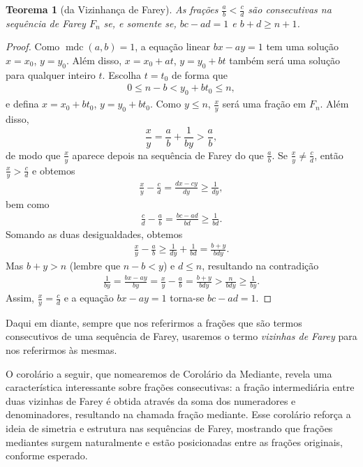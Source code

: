 \documentclass{hipatia}
\newtheorem*{theorem*}{Teorema}
\theoremstyle{definition} %
\begin{document}
\begin{theorem*} [da Vizinhança de Farey]
As frações \(\frac{a}{b} < \frac{c}{d}\) são consecutivas na sequência de Farey \(F_n\) se, e somente se, \(bc - ad = 1\) e $b+d\geq n+1$.
\end{theorem*}

\begin{proof}
Como \(\operatorname{mdc}(a, b) = 1\), a equação linear \(bx - ay = 1\) tem uma solução \(x = x_0\), \(y = y_0\). Além disso, \(x = x_0 + at\), \(y = y_0 + bt\) também será uma solução para qualquer inteiro \(t\). Escolha \(t = t_0\) de forma que
\begin{align*}
0 \leq n - b < y_0 + bt_0 \leq n,
\end{align*}
e defina \(x = x_0 + bt_0\), \(y = y_0 + bt_0\). Como \(y \leq n\), \(\frac{x}{y}\) será uma fração em \(F_n\). Além disso,
\[
\frac{x}{y} = \frac{a}{b} + \frac{1}{by} > \frac{a}{b},
\]
de modo que \(\frac{x}{y}\) aparece depois na sequência de Farey do que \(\frac{a}{b}\). Se \(\frac{x}{y} \neq \frac{c}{d}\), então \(\frac{x}{y} > \frac{c}{d}\) e obtemos
\begin{align*}
\frac{x}{y} - \frac{c}{d} = \frac{dx - cy}{dy} \geq \frac{1}{dy},
\end{align*}
bem como
\begin{align*}
\frac{c}{d} - \frac{a}{b} = \frac{bc - ad}{bd} \geq \frac{1}{bd}.
\end{align*}
Somando as duas desigualdades, obtemos
\begin{align*}
\frac{x}{y} - \frac{a}{b} \geq \frac{1}{dy} + \frac{1}{bd} = \frac{b + y}{bdy}.
\end{align*}
Mas \(b + y > n\) (lembre que \(n - b < y\)) e \(d \leq n\), resultando na contradição
\begin{align*}
\frac{1}{by} = \frac{bx - ay}{by} = \frac{x}{y} - \frac{a}{b} = \frac{b + y}{bdy} > \frac{n}{bdy} \geq \frac{1}{by}.
\end{align*}
Assim, \(\frac{x}{y} = \frac{c}{d}\) e a equação \(bx - ay = 1\) torna-se \(bc - ad = 1\).
\end{proof}

Daqui em diante, sempre que nos referirmos a frações que são termos consecutivos de uma sequência de Farey, usaremos o termo \textit{vizinhas de Farey} para nos referirmos às mesmas. 

O corolário a seguir, que nomearemos de Corolário da Mediante, revela uma característica interessante sobre frações consecutivas: a fração intermediária entre duas vizinhas de Farey é obtida através da soma dos numeradores e denominadores, resultando na chamada fração mediante. Esse corolário reforça a ideia de simetria e estrutura nas sequências de Farey, mostrando que frações mediantes surgem naturalmente e estão posicionadas entre as frações originais, conforme esperado.
\end{document}
